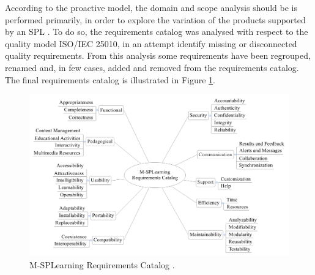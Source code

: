 According to the proactive model, the domain and scope analysis should be is performed primarily, in order to explore the variation of the products supported by an SPL \cite{krueger02}. To do so, the requirements catalog \cite{filho13} was analysed with respect to the quality model ISO/IEC 25010, in an attempt identify missing or disconnected quality requirements.
From this analysis some requirements have been regrouped, renamed and, in few cases, added and removed from the requirements catalog. The final requirements catalog is illustrated in Figure \ref{figureMSPLCatalog}.

\begin{figure}
    \centering
    \includegraphics[scale=0.3815]{figures/section3/MSPLCatalog}
    \caption{M-SPLearning Requirements Catalog \cite{falvojr14b}.}
    \label{figureMSPLCatalog}
\end{figure}

